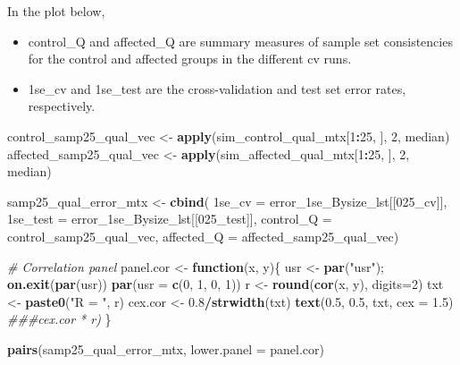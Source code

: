 \documentclass[
]{book}
\newenvironment{Shaded}{\begin{snugshade}}{\end{snugshade}}
\newcommand{\CommentTok}[1]{\textcolor[rgb]{0.56,0.35,0.01}{\textit{#1}}}
\newcommand{\ControlFlowTok}[1]{\textcolor[rgb]{0.13,0.29,0.53}{\textbf{#1}}}
\newcommand{\DataTypeTok}[1]{\textcolor[rgb]{0.13,0.29,0.53}{#1}}
\newcommand{\DecValTok}[1]{\textcolor[rgb]{0.00,0.00,0.81}{#1}}
\newcommand{\FloatTok}[1]{\textcolor[rgb]{0.00,0.00,0.81}{#1}}
\newcommand{\KeywordTok}[1]{\textcolor[rgb]{0.13,0.29,0.53}{\textbf{#1}}}
\newcommand{\NormalTok}[1]{#1}
\newcommand{\OperatorTok}[1]{\textcolor[rgb]{0.81,0.36,0.00}{\textbf{#1}}}
\newcommand{\StringTok}[1]{\textcolor[rgb]{0.31,0.60,0.02}{#1}}
\begin{document}
In the plot below,

\begin{itemize}
\item
  control\_Q and affected\_Q are summary measures of
  sample set consistencies for the control and affected groups in the different
  cv runs.
\item
  1se\_cv and 1se\_test are the cross-validation and test set error rates, respectively.
\end{itemize}

\begin{Shaded}
\begin{Highlighting}[]
\NormalTok{control\_samp25\_qual\_vec <{-}}\StringTok{ }\KeywordTok{apply}\NormalTok{(sim\_control\_qual\_mtx[}\DecValTok{1}\OperatorTok{:}\DecValTok{25}\NormalTok{, ], }\DecValTok{2}\NormalTok{, median)}
\NormalTok{affected\_samp25\_qual\_vec <{-}}\StringTok{ }\KeywordTok{apply}\NormalTok{(sim\_affected\_qual\_mtx[}\DecValTok{1}\OperatorTok{:}\DecValTok{25}\NormalTok{, ], }\DecValTok{2}\NormalTok{, median)}

\NormalTok{samp25\_qual\_error\_mtx <{-}}\StringTok{ }\KeywordTok{cbind}\NormalTok{(}
   \StringTok{\textasciigrave{}}\DataTypeTok{1se\_cv}\StringTok{\textasciigrave{}}\NormalTok{ =}\StringTok{ }\NormalTok{error\_1se\_Bysize\_lst[[}\StringTok{\textquotesingle{}025\_cv\textquotesingle{}}\NormalTok{]],}
   \StringTok{\textasciigrave{}}\DataTypeTok{1se\_test}\StringTok{\textasciigrave{}}\NormalTok{ =}\StringTok{ }\NormalTok{error\_1se\_Bysize\_lst[[}\StringTok{\textquotesingle{}025\_test\textquotesingle{}}\NormalTok{]],}
   \StringTok{\textasciigrave{}}\DataTypeTok{control\_Q}\StringTok{\textasciigrave{}}\NormalTok{ =}\StringTok{ }\NormalTok{control\_samp25\_qual\_vec,}
   \StringTok{\textasciigrave{}}\DataTypeTok{affected\_Q}\StringTok{\textasciigrave{}}\NormalTok{ =}\StringTok{ }\NormalTok{affected\_samp25\_qual\_vec)}
 

\CommentTok{\# Correlation panel}
\NormalTok{panel.cor <{-}}\StringTok{ }\ControlFlowTok{function}\NormalTok{(x, y)\{}
\NormalTok{    usr <{-}}\StringTok{ }\KeywordTok{par}\NormalTok{(}\StringTok{"usr"}\NormalTok{); }\KeywordTok{on.exit}\NormalTok{(}\KeywordTok{par}\NormalTok{(usr))}
    \KeywordTok{par}\NormalTok{(}\DataTypeTok{usr =} \KeywordTok{c}\NormalTok{(}\DecValTok{0}\NormalTok{, }\DecValTok{1}\NormalTok{, }\DecValTok{0}\NormalTok{, }\DecValTok{1}\NormalTok{))}
\NormalTok{    r <{-}}\StringTok{ }\KeywordTok{round}\NormalTok{(}\KeywordTok{cor}\NormalTok{(x, y), }\DataTypeTok{digits=}\DecValTok{2}\NormalTok{)}
\NormalTok{    txt <{-}}\StringTok{ }\KeywordTok{paste0}\NormalTok{(}\StringTok{"R = "}\NormalTok{, r)}
\NormalTok{    cex.cor <{-}}\StringTok{ }\FloatTok{0.8}\OperatorTok{/}\KeywordTok{strwidth}\NormalTok{(txt)}
    \KeywordTok{text}\NormalTok{(}\FloatTok{0.5}\NormalTok{, }\FloatTok{0.5}\NormalTok{, txt, }\DataTypeTok{cex =} \FloatTok{1.5}\NormalTok{) }\CommentTok{\#\#\#cex.cor * r)}
\NormalTok{\}}

\KeywordTok{pairs}\NormalTok{(samp25\_qual\_error\_mtx,}
 \DataTypeTok{lower.panel =}\NormalTok{ panel.cor)}
\end{Highlighting}
\end{Shaded}
\end{document}
